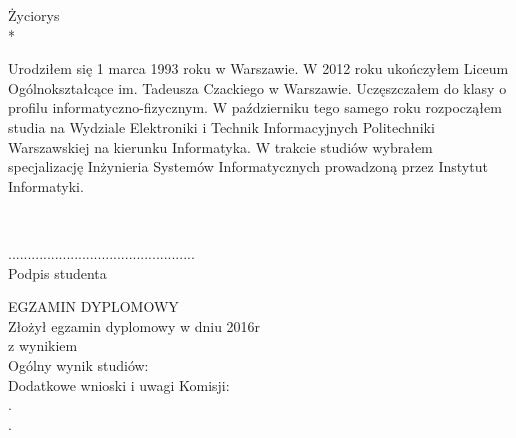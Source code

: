 \begin{center}
    \large Życiorys \\*
\end{center}
    Urodziłem się 1 marca 1993 roku w Warszawie. W 2012 roku ukończyłem Liceum Ogólnokształcące im. Tadeusza Czackiego w Warszawie. Uczęszczałem do klasy o profilu informatyczno-fizycznym. W październiku tego samego roku rozpocząłem studia na Wydziale Elektroniki i Technik Informacyjnych Politechniki Warszawskiej na kierunku Informatyka. W trakcie studiów wybrałem specjalizację Inżynieria Systemów Informatycznych prowadzoną przez Instytut Informatyki.

~\\[0.1cm]
\begin{flushright}
    \begin{minipage}{5.8cm}
        \begin{center}
            ................................................\\
            Podpis studenta
        \end{center}
    \end{minipage}
\end{flushright}

\vfill

\noindent
EGZAMIN DYPLOMOWY\\
Złożył egzamin dyplomowy w dniu \dotfill 2016r\\
z wynikiem \dotfill \\
Ogólny wynik studiów: \dotfill \\
Dodatkowe wnioski i uwagi Komisji: \dotfill \\
.\dotfill \\
.\dotfill \\
